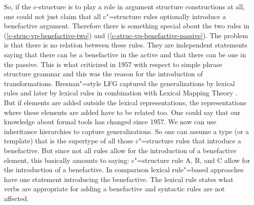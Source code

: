 So, if the c-structure is to play a role in argument structure constructions at all, one could not
just claim that all c"=structure rules optionally introduce a benefactive argument. Therefore there is something special about the two rules in (\ref{c-struc-vp-benefactive-two})
and (\ref{c-struc-vp-benefactive-passive}). The problem is that there is no relation between these
rules. They are independent statements saying that there can be a benefactive in the active and that
there can be one in the passive. This is what \citet[]{Chomsky57a} criticized in 1957 with
respect to simple phrase structure grammar and
this was the reason for the introduction of transformations. Bresnan"=style LFG captured the
generalizations by lexical rules \citep{Bresnan78a,Bresnan82a} and later by lexical rules in combination with Lexical Mapping
Theory \citep{Toivonen2013a}. But if elements are added
outside the lexical representations, the representations where these elements are added 
have to be related too. One could say that our knowledge about formal tools has changed since
1957. We now can use inheritance hierarchies to capture generalizations. So one can assume a type
(or a template) that is the supertype of all those c"=structure rules that introduce a
benefactive. But since not all rules allow for the introduction of a benefactive element, this
basically amounts to saying: c"=structure rule A, B, and C allow for the introduction of a
benefactive. In comparison lexical rule"=based approaches have one statement introducing the
benefactive. The lexical rule states what verbs are appropriate for adding a benefactive and
syntactic rules are not affected.

